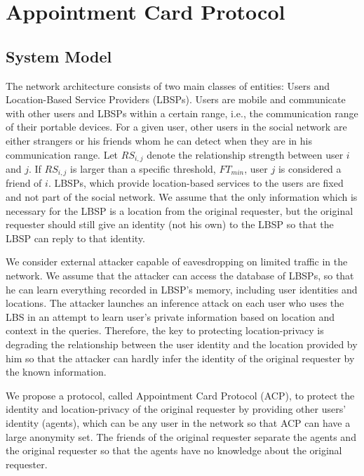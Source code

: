 


\chapter{Appointment Card Protocol}
\label{CACP}
\section{System Model}

\noindent The network architecture consists of two main classes of entities: Users and Location-Based Service Providers (LBSPs). Users are mobile and communicate with other users and LBSPs within a certain range, i.e., the communication range of their portable devices. For a given user, other users in the social network are either strangers or his friends whom he can detect when they are in his communication range. Let ${RS}_{i,j}$ denote the relationship strength between user $i$ and $j$. If ${RS}_{i,j}$ is larger than a specific threshold, ${FT}_{min}$, user $j$ is considered a friend of $i$. LBSPs, which provide location-based services to the users are fixed and not part of the social network. We assume that the only information which is necessary for the LBSP is a location from the original requester, but the original requester should still give an identity (not his own) to the LBSP so that the LBSP can reply to that identity.

We consider external attacker capable of eavesdropping on limited traffic in the network. We assume that the attacker can access the database of LBSPs, so that he can learn everything recorded in LBSP's memory, including user identities and locations. The attacker launches an inference attack on each user who uses the LBS in an attempt to learn user's private information based on location and context in the queries. Therefore, the key to protecting location-privacy is degrading the relationship between the user identity and the location provided by him so that the attacker can hardly infer the identity of the original requester by the known information. 

We propose a protocol, called Appointment Card Protocol (ACP), to protect the identity and location-privacy of the original requester by providing other users' identity (agents), which can be any user in the network so that ACP can have a large anonymity set. The friends of the original requester separate the agents and the original requester so that the agents have no knowledge about the original requester.


